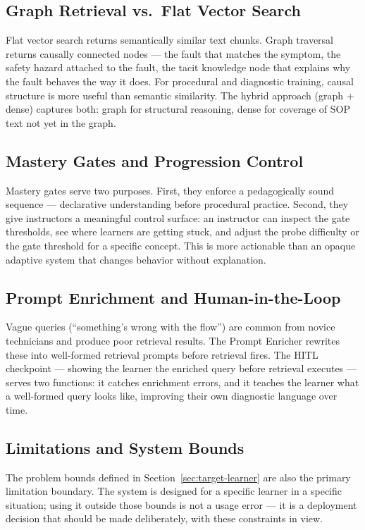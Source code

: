 \documentclass[11pt,letterpaper]{article}
\begin{document}
\subsection{Graph Retrieval vs.\ Flat Vector Search}
Flat vector search returns semantically similar text chunks. Graph traversal returns causally connected nodes --- the fault that matches the symptom, the safety hazard attached to the fault, the tacit knowledge node that explains why the fault behaves the way it does. For procedural and diagnostic training, causal structure is more useful than semantic similarity. The hybrid approach (graph + dense) captures both: graph for structural reasoning, dense for coverage of SOP text not yet in the graph.

\subsection{Mastery Gates and Progression Control}
Mastery gates serve two purposes. First, they enforce a pedagogically sound sequence --- declarative understanding before procedural practice. Second, they give instructors a meaningful control surface: an instructor can inspect the gate thresholds, see where learners are getting stuck, and adjust the probe difficulty or the gate threshold for a specific concept. This is more actionable than an opaque adaptive system that changes behavior without explanation.

\subsection{Prompt Enrichment and Human-in-the-Loop}
Vague queries (``something's wrong with the flow'') are common from novice technicians and produce poor retrieval results. The Prompt Enricher rewrites these into well-formed retrieval prompts before retrieval fires. The HITL checkpoint --- showing the learner the enriched query before retrieval executes --- serves two functions: it catches enrichment errors, and it teaches the learner what a well-formed query looks like, improving their own diagnostic language over time.

\subsection{Limitations and System Bounds}
\label{sec:limitations}

The problem bounds defined in Section~\ref{sec:target-learner} are also the primary limitation boundary. The system is designed for a specific learner in a specific situation; using it outside those bounds is not a usage error --- it is a deployment decision that should be made deliberately, with these constraints in view.
\end{document}
